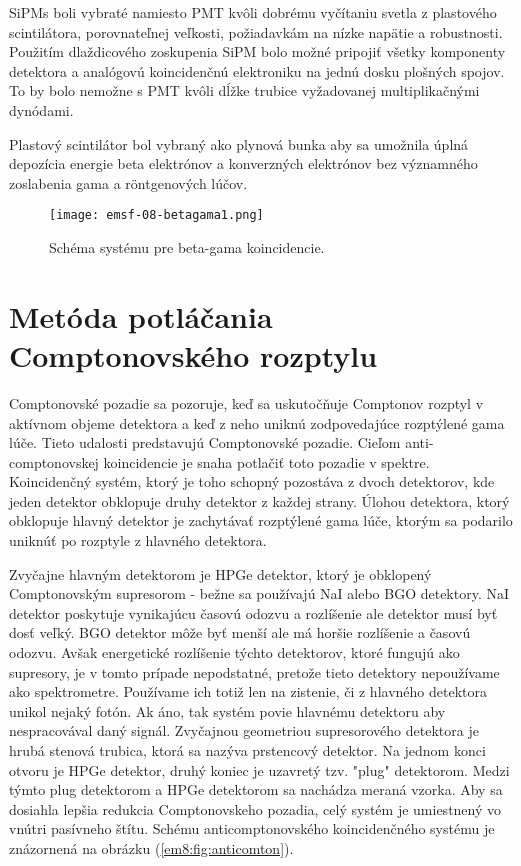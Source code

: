 \documentclass[../../main.tex]{subfiles}
\begin{document}
SiPMs boli vybraté namiesto PMT kvôli dobrému vyčítaniu svetla z  plastového scintilátora, porovnateľnej veľkosti, požiadavkám na nízke napätie a robustnosti. Použitím dlaždicového zoskupenia SiPM bolo možné pripojiť všetky komponenty detektora a analógovú koincidenčnú elektroniku na jednú dosku plošných spojov. To by bolo nemožne s PMT kvôli dĺžke trubice vyžadovanej multiplikačnými dynódami.

Plastový scintilátor bol vybraný ako plynová bunka aby sa umožnila úplná depozícia energie beta elektrónov a konverzných elektrónov bez významného zoslabenia gama a röntgenových lúčov.

\begin{figure}[!h]
\texttt{[image: emsf-08-betagama1.png]}
\centering
\caption{Schéma systému pre beta-gama koincidencie.}
\label{em8:fig:betagama1}
\end{figure}

\section{Metóda potláčania Comptonovského rozptylu}
Comptonovské pozadie sa pozoruje, keď sa uskutočňuje Comptonov rozptyl v aktívnom objeme detektora a keď z neho uniknú zodpovedajúce rozptýlené gama lúče. Tieto udalosti predstavujú Comptonovské pozadie. Cieľom anti-comptonovskej koincidencie je snaha potlačiť toto pozadie v spektre. Koincidenčný systém, ktorý je toho schopný pozostáva z dvoch detektorov, kde jeden detektor obklopuje druhy detektor z každej strany. Úlohou detektora, ktorý obklopuje hlavný detektor je zachytávať rozptýlené gama lúče, ktorým sa podarilo uniknúť po rozptyle z hlavného detektora. 

Zvyčajne hlavným detektorom je HPGe detektor, ktorý je obklopený Comptonovským supresorom - bežne sa používajú NaI alebo BGO detektory. NaI detektor poskytuje vynikajúcu časovú odozvu a rozlíšenie ale detektor musí byť dosť veľký. BGO detektor môže byť menší ale má horšie rozlíšenie a časovú odozvu. Avšak energetické rozlíšenie týchto detektorov, ktoré fungujú ako supresory, je v tomto prípade nepodstatné, pretože tieto detektory nepoužívame ako spektrometre. Používame ich totiž len na zistenie, či z hlavného detektora unikol nejaký fotón. Ak áno, tak systém povie hlavnému detektoru aby nespracovával daný signál. Zvyčajnou geometriou supresorového detektora je hrubá stenová trubica, ktorá sa nazýva prstencový detektor. Na jednom konci otvoru je HPGe detektor, druhý koniec je uzavretý tzv. "plug" detektorom. Medzi týmto plug detektorom a HPGe detektorom sa nachádza meraná vzorka. Aby sa dosiahla lepšia redukcia Comptonovskeho pozadia, celý systém je umiestnený vo vnútri pasívneho štítu. Schému anticomptonovského koincidenčného systému je znázornená na obrázku (\ref{em8:fig:anticomton}).
\end{document}

